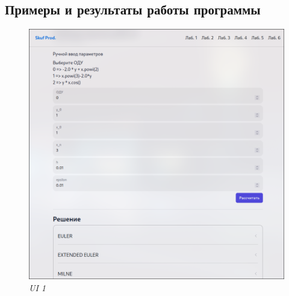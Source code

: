 \documentclass{article}
\begin{document}
      \subsection{Примеры и результаты работы программы}
            \begin{figure}[H] 
                  \begin{center}  
                        \includegraphics[scale=0.4]{ui1.png}
                        \caption{\small \sl {UI  1}}  
                  \end{center}  
            \end{figure}
\end{document}

